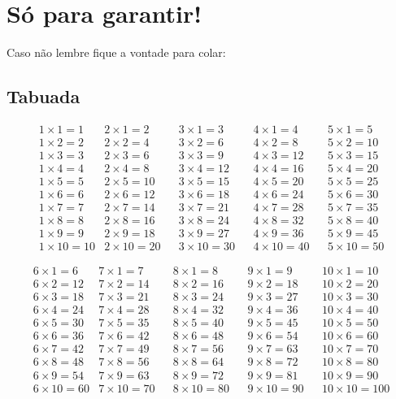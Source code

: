 \chapter{Só para garantir!}
 Caso não lembre fique a vontade para colar:
 \section{Tabuada}
 
 \begin{align*} 
 & 1 \times 1= 1 & 2 \times 1= 2 & & 3 \times 1= 3 & & 4 \times 1= 4 & & 5 \times 1= 5 &\\
 & 1 \times 2= 2 & 2 \times 2= 4 & & 3 \times 2= 6 & & 4 \times 2= 8 & & 5 \times 2= 10 &\\
 & 1 \times 3= 3 & 2 \times 3= 6 & & 3 \times 3= 9 & & 4 \times 3= 12 & & 5 \times 3= 15 &\\
 & 1 \times 4= 4 & 2 \times 4= 8 & & 3 \times 4= 12 & & 4 \times 4= 16 & & 5 \times 4= 20 &\\
 & 1 \times 5= 5 & 2 \times 5= 10 & & 3 \times 5= 15 & & 4 \times 5= 20 & & 5 \times 5= 25 &\\
 & 1 \times 6= 6 & 2 \times 6= 12 & & 3 \times 6= 18 & & 4 \times 6= 24 & & 5 \times 6= 30 &\\
 & 1 \times 7= 7 & 2 \times 7= 14 & & 3 \times 7= 21 & & 4 \times 7= 28 & & 5 \times 7= 35 &\\
 & 1 \times 8= 8 & 2 \times 8= 16 & & 3 \times 8= 24 & & 4 \times 8= 32 & & 5 \times 8= 40 &\\
 & 1 \times 9= 9 & 2 \times 9= 18 & & 3 \times 9= 27 & & 4 \times 9= 36 & & 5 \times 9= 45 &\\
 & 1 \times 10= 10 & 2 \times 10= 20 & & 3 \times 10= 30 & & 4 \times 10= 40 & & 5 \times 10= 50 & 
 \end{align*}
 
 \begin{align*} 
 & 6 \times 1= 6 & 7 \times 1= 7 & & 8 \times 1= 8 & & 9 \times 1= 9 & & 10 \times 1= 10 &\\
 & 6 \times 2= 12 & 7 \times 2= 14 & & 8 \times 2= 16 & & 9 \times 2= 18 & & 10 \times 2= 20 &\\
 & 6 \times 3= 18 & 7 \times 3= 21 & & 8 \times 3= 24 & & 9 \times 3= 27 & & 10 \times 3= 30 &\\
 & 6 \times 4= 24 & 7 \times 4= 28 & & 8 \times 4= 32 & & 9 \times 4= 36 & & 10 \times 4= 40 &\\
 & 6 \times 5= 30 & 7 \times 5= 35 & & 8 \times 5= 40 & & 9 \times 5= 45 & & 10 \times 5= 50 &\\
 & 6 \times 6= 36 & 7 \times 6= 42 & & 8 \times 6= 48 & & 9 \times 6= 54 & & 10 \times 6= 60 &\\
 & 6 \times 7= 42 & 7 \times 7= 49 & & 8 \times 7= 56 & & 9 \times 7= 63 & & 10 \times 7= 70 &\\
 & 6 \times 8= 48 & 7 \times 8= 56 & & 8 \times 8= 64 & & 9 \times 8= 72 & & 10 \times 8= 80 &\\
 & 6 \times 9= 54 & 7 \times 9= 63 & & 8 \times 9= 72 & & 9 \times 9= 81 & & 10 \times 9= 90 &\\
 & 6 \times 10= 60 & 7 \times 10= 70 & & 8 \times 10= 80 & & 9 \times 10= 90 & & 10 \times 10= 100 & 
 \end{align*}
 
